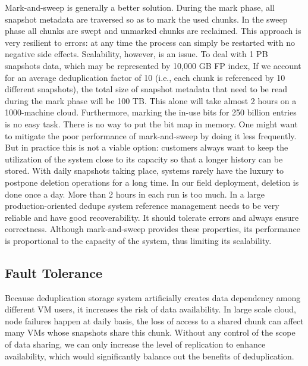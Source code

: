 {Mark-and-sweep is generally a better solution. 
During the mark phase, all snapshot metadata are traversed 
so as to mark the used chunks. 
In the sweep phase all chunks are swept and unmarked chunks are reclaimed. 
This approach is very resilient to errors: 
at any time the process can simply be restarted with no negative side effects. 
Scalability, however, is an issue.
To deal with 1 PB snapshots data, which may be represented by 10,000 GB FP index,
If we account
for an average deduplication factor of 10 (i.e., each chunk
is referenced by 10 different snapshots),
the total size
of snapshot metadata that need to be read during the mark phase will
be 100 TB. 
This alone will take almost 2 hours on a
1000-machine cloud. Furthermore, marking the in-use
bits for 250 billion entries is no easy task. There is no
way to put the bit map in memory. One might want
to mitigate the poor performance of mark-and-sweep by
doing it less frequently. But in practice this is not a viable
option: customers always want to keep the utilization
of the system close to its capacity so that a longer
history can be stored. With daily snapshots taking place,
systems rarely have the luxury to postpone deletion operations
for a long time. In our field deployment, deletion
is done once a day. More than 2 hours in each run is too
much. In a large production-oriented dedupe system reference
management needs to be very reliable and have
good recoverability. It should tolerate errors and always
ensure correctness. Although mark-and-sweep provides
these properties, its performance is proportional to the
capacity of the system, thus limiting its scalability.

\subsection{Fault Tolerance}
Because deduplication storage system
 artificially creates data dependency among different VM users,
it increases the risk of data availability.
In large scale cloud, node failures happen at daily basis,
the loss of access to a shared chunk can affect many VMs whose snapshots share this chunk. 
Without any control of the scope of data sharing, we can only increase the level of 
replication to enhance availability, which would significantly 
balance out the benefits of deduplication.

}
